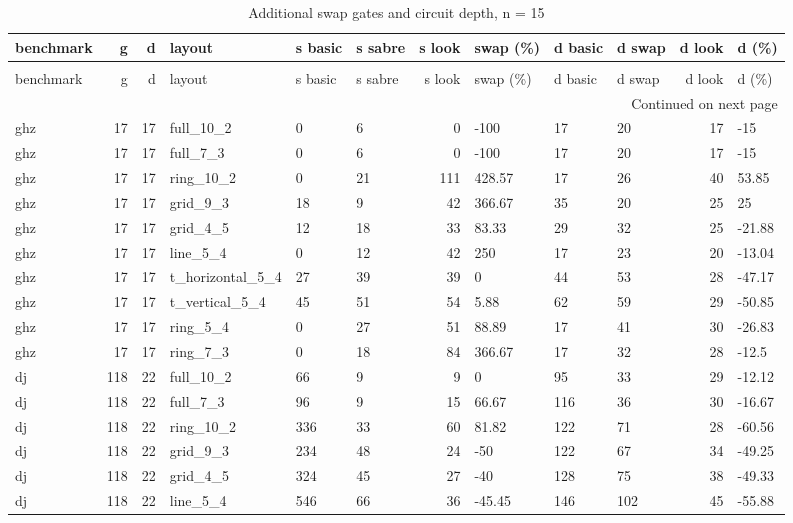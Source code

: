 \begin{longtable}{lrrlllrlllrl}
\caption{Additional swap gates and circuit depth, n = 15} \label{benchmark-table-15} \\
\toprule
benchmark & g & d & layout & s basic & s sabre & s look & swap (\%) & d basic & d swap & d look & d (\%) \\
\midrule
\endfirsthead
\caption[]{Additional swap gates and circuit depth, n = 15} \\
\toprule
benchmark & g & d & layout & s basic & s sabre & s look & swap (\%) & d basic & d swap & d look & d (\%) \\
\midrule
\endhead
\midrule
\multicolumn{12}{r}{Continued on next page} \\
\midrule
\endfoot
\bottomrule
\endlastfoot
ghz & 17 & 17 & full\_10\_2 & 0 & 6 & 0 & -100 & 17 & 20 & 17 & -15 \\
ghz & 17 & 17 & full\_7\_3 & 0 & 6 & 0 & -100 & 17 & 20 & 17 & -15 \\
ghz & 17 & 17 & ring\_10\_2 & 0 & 21 & 111 & 428.57 & 17 & 26 & 40 & 53.85 \\
ghz & 17 & 17 & grid\_9\_3 & 18 & 9 & 42 & 366.67 & 35 & 20 & 25 & 25 \\
ghz & 17 & 17 & grid\_4\_5 & 12 & 18 & 33 & 83.33 & 29 & 32 & 25 & -21.88 \\
ghz & 17 & 17 & line\_5\_4 & 0 & 12 & 42 & 250 & 17 & 23 & 20 & -13.04 \\
ghz & 17 & 17 & t\_horizontal\_5\_4 & 27 & 39 & 39 & 0 & 44 & 53 & 28 & -47.17 \\
ghz & 17 & 17 & t\_vertical\_5\_4 & 45 & 51 & 54 & 5.88 & 62 & 59 & 29 & -50.85 \\
ghz & 17 & 17 & ring\_5\_4 & 0 & 27 & 51 & 88.89 & 17 & 41 & 30 & -26.83 \\
ghz & 17 & 17 & ring\_7\_3 & 0 & 18 & 84 & 366.67 & 17 & 32 & 28 & -12.5 \\
dj & 118 & 22 & full\_10\_2 & 66 & 9 & 9 & 0 & 95 & 33 & 29 & -12.12 \\
dj & 118 & 22 & full\_7\_3 & 96 & 9 & 15 & 66.67 & 116 & 36 & 30 & -16.67 \\
dj & 118 & 22 & ring\_10\_2 & 336 & 33 & 60 & 81.82 & 122 & 71 & 28 & -60.56 \\
dj & 118 & 22 & grid\_9\_3 & 234 & 48 & 24 & -50 & 122 & 67 & 34 & -49.25 \\
dj & 118 & 22 & grid\_4\_5 & 324 & 45 & 27 & -40 & 128 & 75 & 38 & -49.33 \\
dj & 118 & 22 & line\_5\_4 & 546 & 66 & 36 & -45.45 & 146 & 102 & 45 & -55.88 \\

\end{longtable}
